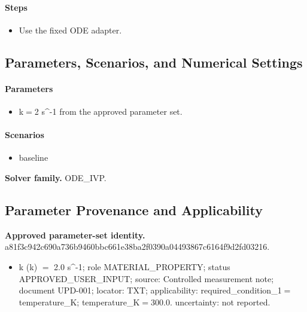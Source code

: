 \documentclass[11pt]{article}
\begin{document}
\paragraph{Steps}
\begin{itemize}\raggedright
\item Use the fixed ODE adapter.
\end{itemize}

\subsection{Parameters, Scenarios, and Numerical Settings}

\paragraph{Parameters}
\begin{itemize}\raggedright
\item k\ensuremath{=}2 s\textasciicircum{}-1 from the approved parameter set.
\end{itemize}

\paragraph{Scenarios}
\begin{itemize}\raggedright
\item baseline
\end{itemize}

\noindent\textbf{Solver family.} ODE\_IVP.

\subsection{Parameter Provenance and Applicability}

\noindent\textbf{Approved parameter-set identity.} a81f3c942c690a73\allowbreak{}6b9460bbc661e38b\allowbreak{}a2f0390a04493867\allowbreak{}c6164f9d2fd03216.
\begin{itemize}\raggedright
\item k (k) \ensuremath{=} 2.0 s\textasciicircum{}-1; role MATERIAL\_\allowbreak{}PROPERTY; status APPROVED\_\allowbreak{}USER\_\allowbreak{}INPUT; source: Controlled measurement note; document UPD-001; locator: TXT; applicability: required\_\allowbreak{}condition\_\allowbreak{}1\ensuremath{=}temperature\_\allowbreak{}K; temperature\_\allowbreak{}K\ensuremath{=}300.0. uncertainty: not reported.
\end{itemize}
\end{document}
